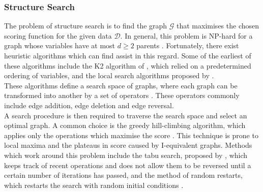 \documentclass [11pt]{article}
\begin{document}
\subsubsection{Structure Search}
The problem of structure search is to find the graph $\mathcal{G}$ that maximises the chosen scoring function for the given data $\mathcal{D}$. In general, this problem is NP-hard for a graph whose variables have at most $d\geq 2$ parents \citep{chickering96}. Fortunately, there exist heuristic algorithms which can find assist in this regard. Some of the earliest of these algorithms include the K2 algorithm of \citet{cooper92}, which relied on a predetermined ordering of variables, and the local search algorithms proposed by \citet{heckerman95}.
\\
These algorithms define a search space of graphs, where each graph can be transformed into another by a set of operators \citep{koller09}. These operators commonly include edge addition, edge deletion and edge reversal. 
\\
A search procedure is then required to traverse the search space and select an optimal graph. A common choice is the greedy hill-climbing algorithm, which applies only the operations which maximise the score \citep{koller09}. This technique is prone to local maxima and the plateaus in score caused by I-equivalent graphs. Methods which work around this problem include the tabu search, proposed by \citet{glover86}, which keeps track of recent operations and does not allow them to be reversed until a certain number of iterations has passed, and the method of random restarts, which restarts the search with random initial conditions \citep{koller09}.
\end{document}
